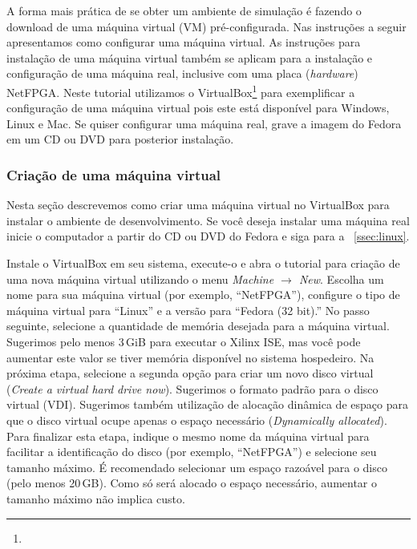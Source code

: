 A forma mais prática de se obter um ambiente de simulação é fazendo o
download de uma máquina virtual (VM) pré-configurada. Nas instruções a
seguir apresentamos como configurar uma máquina virtual.  As instruções
para instalação de uma máquina virtual também se aplicam para a
instalação e configuração de uma máquina real, inclusive com uma placa
(\emph{hardware}) NetFPGA.  Neste tutorial utilizamos o
VirtualBox\footnote{} para exemplificar
a configuração de uma máquina virtual pois este está disponível para
Windows, Linux e Mac.  Se quiser configurar uma máquina real, grave a
imagem do Fedora em um CD ou DVD para posterior instalação.

\subsubsection{Criação de uma máquina virtual}

Nesta seção descrevemos como criar uma máquina virtual no VirtualBox
para instalar o ambiente de desenvolvimento.  Se você deseja instalar
uma máquina real inicie o computador a partir do CD ou DVD do Fedora e
siga para a \secstr~\ref{ssec:linux}.


Instale o VirtualBox em seu sistema, execute-o e abra o tutorial para
criação de uma nova máquina virtual utilizando o menu \emph{Machine
$\rightarrow$ New}.  Escolha um nome para sua máquina virtual (por
exemplo, ``NetFPGA''), configure o tipo de máquina virtual para
``Linux'' e a versão para ``Fedora (32 bit).''  No passo seguinte,
selecione a quantidade de memória desejada para a máquina virtual.
Sugerimos pelo menos 3\,GiB para executar o Xilinx ISE, mas você pode
aumentar este valor se tiver memória disponível no sistema hospedeiro.
Na próxima etapa, selecione a segunda opção para criar um novo disco
virtual (\emph{Create a virtual hard drive now}).  Sugerimos o formato
padrão para o disco virtual (VDI).  Sugerimos também utilização de
alocação dinâmica de espaço para que o disco virtual ocupe apenas o
espaço necessário (\emph{Dynamically allocated}).  Para finalizar esta
etapa, indique o mesmo nome da máquina virtual para facilitar a
identificação do disco (por exemplo, ``NetFPGA'') e selecione seu
tamanho máximo.  É recomendado selecionar um espaço razoável para o
disco (pelo menos 20\,GB).  Como só será alocado o espaço necessário,
aumentar o tamanho máximo não implica custo.


